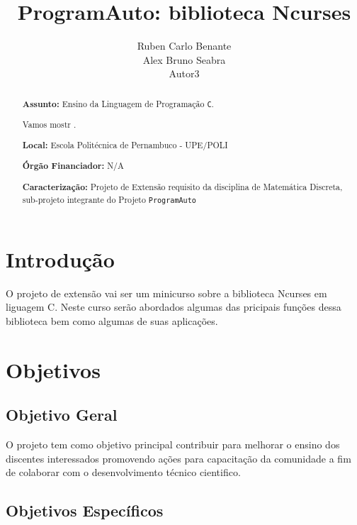 \documentclass[a4paper,10pt]{article} %
\title{ProgramAuto: biblioteca Ncurses}
\author{Ruben Carlo Benante \\ Alex Bruno Seabra \\ Autor3}  %
\begin{document}
\maketitle

\begin{abstract}

\textbf{Assunto:} Ensino da Linguagem de Programação \texttt{C}.

Vamos mostr .

\textbf{Local:} Escola Politécnica de Pernambuco - UPE/POLI

\textbf{Órgão Financiador:} N/A

\textbf{Caracterização:} Projeto de Extensão requisito da disciplina de Matemática Discreta, sub-projeto integrante do Projeto \texttt{ProgramAuto}


\end{abstract}


\section{Introdução}


O projeto de extensão vai ser um minicurso sobre a biblioteca Ncurses em liguagem C. Neste curso serão abordados algumas 
das pricipais  funções dessa biblioteca bem como algumas de suas aplicações.

\section{Objetivos}

\subsection{Objetivo Geral}
O projeto tem como objetivo principal contribuir para melhorar o ensino dos discentes interessados promovendo ações para capacitação da comunidade a fim de colaborar com o desenvolvimento técnico cientifico.

\subsection{Objetivos Específicos}
\end{document}
